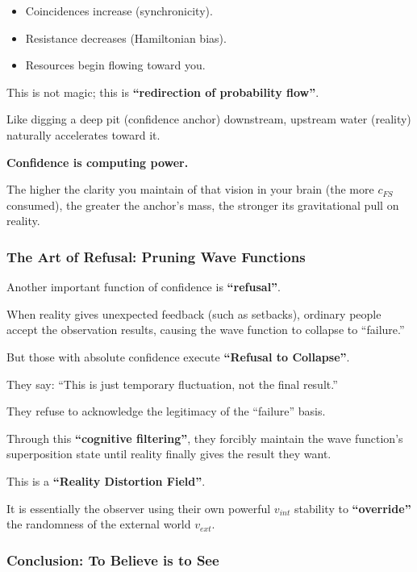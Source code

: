 \begin{itemize}
\item Coincidences increase (synchronicity).

\item Resistance decreases (Hamiltonian bias).

\item Resources begin flowing toward you.
\end{itemize}

This is not magic; this is \textbf{``redirection of probability flow''}.

Like digging a deep pit (confidence anchor) downstream, upstream water (reality) naturally accelerates toward it.

\textbf{Confidence is computing power.}

The higher the clarity you maintain of that vision in your brain (the more $c_{FS}$ consumed), the greater the anchor's mass, the stronger its gravitational pull on reality.

\subsubsection{The Art of Refusal: Pruning Wave Functions}

Another important function of confidence is \textbf{``refusal''}.

When reality gives unexpected feedback (such as setbacks), ordinary people accept the observation results, causing the wave function to collapse to ``failure.''

But those with absolute confidence execute \textbf{``Refusal to Collapse''}.

They say: ``This is just temporary fluctuation, not the final result.''

They refuse to acknowledge the legitimacy of the ``failure'' basis.

Through this \textbf{``cognitive filtering''}, they forcibly maintain the wave function's superposition state until reality finally gives the result they want.

This is a \textbf{``Reality Distortion Field''}.

It is essentially the observer using their own powerful $v_{int}$ stability to \textbf{``override''} the randomness of the external world $v_{ext}$.

\subsubsection{Conclusion: To Believe is to See}

